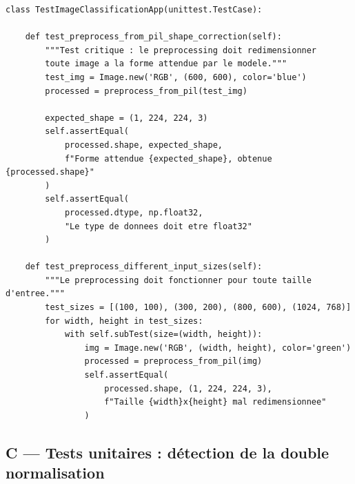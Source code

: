 \documentclass[french, a4paper, 12pt]{article}
\begin{document}
\begin{verbatim}
class TestImageClassificationApp(unittest.TestCase):

    def test_preprocess_from_pil_shape_correction(self):
        """Test critique : le preprocessing doit redimensionner
        toute image a la forme attendue par le modele."""
        test_img = Image.new('RGB', (600, 600), color='blue')
        processed = preprocess_from_pil(test_img)

        expected_shape = (1, 224, 224, 3)
        self.assertEqual(
            processed.shape, expected_shape,
            f"Forme attendue {expected_shape}, obtenue {processed.shape}"
        )
        self.assertEqual(
            processed.dtype, np.float32,
            "Le type de donnees doit etre float32"
        )

    def test_preprocess_different_input_sizes(self):
        """Le preprocessing doit fonctionner pour toute taille d'entree."""
        test_sizes = [(100, 100), (300, 200), (800, 600), (1024, 768)]
        for width, height in test_sizes:
            with self.subTest(size=(width, height)):
                img = Image.new('RGB', (width, height), color='green')
                processed = preprocess_from_pil(img)
                self.assertEqual(
                    processed.shape, (1, 224, 224, 3),
                    f"Taille {width}x{height} mal redimensionnee"
                )
\end{verbatim}

\subsection*{C --- Tests unitaires : détection de la double normalisation}
\end{document}
